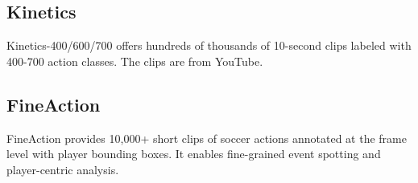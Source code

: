 \subsection{Kinetics}
Kinetics-400/600/700 \cite{dataset:kinetics} offers hundreds of thousands of 10-second clips labeled with 400-700 action classes. The clips are from YouTube.

\subsection{FineAction}
FineAction \cite{dataset:fineaction} provides 10,000+ short clips of soccer actions annotated at the frame level with player bounding boxes. It enables fine-grained event spotting and player-centric analysis.








